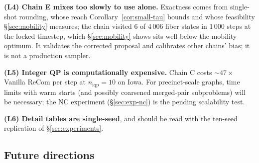 \documentclass[11pt]{article}
\begin{document}
\textbf{(L4) Chain E mixes too slowly to use alone.} Exactness comes
from single-shot rounding, whose reach Corollary~\ref{cor:small-tau}
bounds and whose feasibility \S\ref{sec:mobility} measures; the chain
visited 6 of 4\,006 fiber states in 1\,000 steps at the locked
timestep, which \S\ref{sec:mobility} shows sits well below the
mobility optimum. It validates the corrected
proposal and calibrates other chains' bias; it is not a production
sampler.

\textbf{(L5) Integer QP is computationally expensive.} Chain C costs
$\sim 47\times$ Vanilla ReCom per step at $n_{\mathrm{iqp}} = 10$ on
Iowa. For precinct-scale graphs, time limits with warm starts (and
possibly coarsened merged-pair subproblems) will be necessary; the
NC experiment (\S\ref{sec:exp-nc}) is the pending scalability test.

\textbf{(L6) Detail tables are single-seed}, and should be read with
the ten-seed replication of \S\ref{sec:experiments}.

\subsection{Future directions}\label{sec:disc-future}
\end{document}
